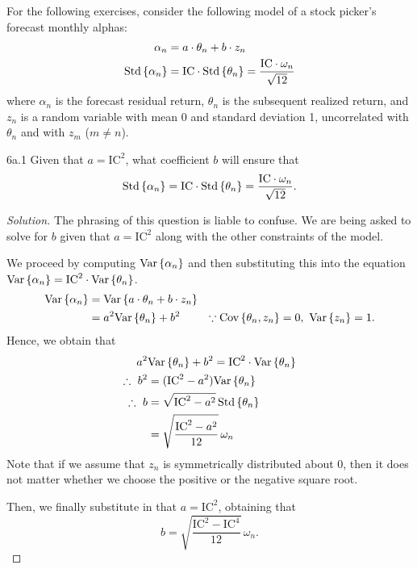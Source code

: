 
For the following exercises, consider the following model of a stock picker's forecast monthly alphas:
\begin{align*}
\alpha_{n} &= a \cdot \theta_{n} + b \cdot z_{n}\\
\mathrm{Std}\left\lbrace\alpha_{n}\right\rbrace &= \mathrm{IC} \cdot \mathrm{Std}\left\lbrace\theta_{n}\right\rbrace = \frac{\mathrm{IC} \cdot \omega_{n}}{\sqrt{12}}
\end{align*}
where $\alpha_{n}$ is the forecast residual return, $\theta_{n}$ is the subsequent realized return, and $z_{n}$ is a random variable with mean 0 and standard deviation 1, uncorrelated with $\theta_{n}$ and with $z_{m}$ ($m \neq n$).

\begin{problem}{6a.1}
Given that $a = \mathrm{IC}^{2}$, what coefficient $b$ will ensure that \[\mathrm{Std}\left\lbrace\alpha_{n}\right\rbrace = \mathrm{IC} \cdot \mathrm{Std}\left\lbrace\theta_{n}\right\rbrace = \frac{\mathrm{IC} \cdot \omega_{n}}{\sqrt{12}}.\]
\end{problem}

\begin{proof}[Solution]
The phrasing of this question is liable to confuse. We are being asked to solve for $b$ given that $a = \mathrm{IC}^{2}$ along with the other constraints of the model.

We proceed by computing $\mathrm{Var}\left\lbrace\alpha_{n}\right\rbrace$ and then substituting this into the equation $\mathrm{Var}\left\lbrace\alpha_{n}\right\rbrace = \mathrm{IC}^{2} \cdot \mathrm{Var}\left\lbrace\theta_{n}\right\rbrace$.
\begin{align*}
\mathrm{Var}\left\lbrace\alpha_{n}\right\rbrace &= \mathrm{Var}\left\lbrace a\cdot \theta_{n} + b \cdot z_{n}\right\rbrace\\
&= a^{2}\mathrm{Var}\left\lbrace\theta_{n}\right\rbrace + b^{2} &\because \mathrm{Cov}\left\lbrace\theta_{n},z_{n}\right\rbrace = 0,~ \mathrm{Var}\left\lbrace z_{n}\right\rbrace = 1. 
\end{align*}
Hence, we obtain that
\begin{align*}
a^{2}&\mathrm{Var}\left\lbrace\theta_{n}\right\rbrace + b^{2} = \mathrm{IC}^{2} \cdot \mathrm{Var}\left\lbrace\theta_{n}\right\rbrace\\
\therefore~b^{2} &= (\mathrm{IC}^{2} - a^{2})\mathrm{Var}\left\lbrace\theta_{n}\right\rbrace\\
\therefore~b &= \sqrt{\mathrm{IC}^{2} - a^{2}}\,\mathrm{Std}\left\lbrace\theta_{n}\right\rbrace\\
&=\sqrt{\frac{\mathrm{IC}^{2} - a^{2}}{12}}\,\omega_{n}
\end{align*}
Note that if we assume that $z_{n}$ is symmetrically distributed about 0, then it does not matter whether we choose the positive or the negative square root.

Then, we finally substitute in that $a = \mathrm{IC}^{2}$, obtaining that \[b = \sqrt{\frac{\mathrm{IC}^{2} - \mathrm{IC}^{4}}{12}}\,\omega_{n}.\]
\end{proof}

